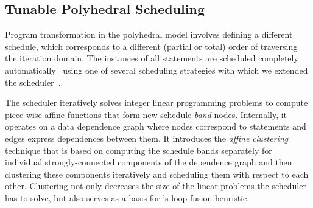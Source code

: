 %
%

\subsection{Tunable Polyhedral Scheduling}
Program transformation in the polyhedral model involves defining a different
schedule, which corresponds to a different (partial or total) order of
traversing the iteration domain.  The instances of all statements are scheduled
completely automatically~\cite{Bondhugula2008Pluto} using one of several
scheduling strategies with which we extended the \isl
scheduler~\cite{Verdoolaege2017scheduler}.

The \isl scheduler iteratively solves integer linear programming problems to
compute piece-wise affine functions that form new schedule \emph{band} nodes.
Internally, it operates on a data dependence graph where nodes correspond to
statements and edges express dependences between them.  It introduces the
\emph{affine clustering} technique that is based on computing the schedule
bands separately for individual strongly-connected components of the dependence
graph and then clustering these components iteratively and scheduling them with
respect to each other.  Clustering not only decreases the size of the linear
problems the scheduler has to solve, but also serves as a basis for \isl's loop
fusion heuristic.

